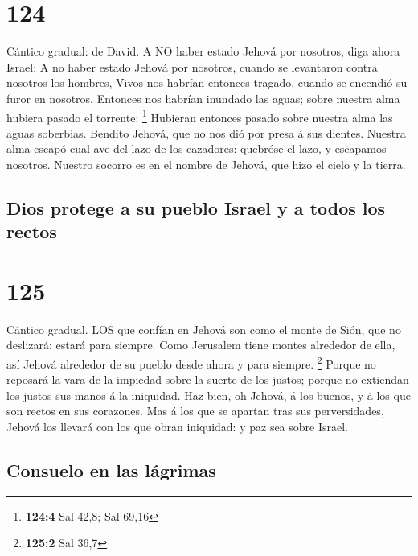 \hypertarget{section-123}{%
\section{124}\label{section-123}}

 Cántico gradual: de David. A NO haber estado Jehová por
nosotros, diga ahora Israel;  A no haber estado Jehová por
nosotros, cuando se levantaron contra nosotros los hombres, 
Vivos nos habrían entonces tragado, cuando se encendió su furor en
nosotros.  Entonces nos habrían inundado las aguas; sobre
nuestra alma hubiera pasado el torrente: \footnote{\textbf{124:4} Sal
  42,8; Sal 69,16}  Hubieran entonces pasado sobre nuestra
alma las aguas soberbias.  Bendito Jehová, que no nos dió
por presa á sus dientes.  Nuestra alma escapó cual ave del
lazo de los cazadores: quebróse el lazo, y escapamos nosotros.
 Nuestro socorro es en el nombre de Jehová, que hizo el
cielo y la tierra.

\hypertarget{dios-protege-a-su-pueblo-israel-y-a-todos-los-rectos}{%
\subsection{Dios protege a su pueblo Israel y a todos los
rectos}\label{dios-protege-a-su-pueblo-israel-y-a-todos-los-rectos}}

\hypertarget{section-124}{%
\section{125}\label{section-124}}

 Cántico gradual. LOS que confían en Jehová son como el
monte de Sión, que no deslizará: estará para siempre.  Como
Jerusalem tiene montes alrededor de ella, así Jehová alrededor de su
pueblo desde ahora y para siempre. \footnote{\textbf{125:2} Sal 36,7}
 Porque no reposará la vara de la impiedad sobre la suerte
de los justos; porque no extiendan los justos sus manos á la iniquidad.
 Haz bien, oh Jehová, á los buenos, y á los que son rectos
en sus corazones.  Mas á los que se apartan tras sus
perversidades, Jehová los llevará con los que obran iniquidad: y paz sea
sobre Israel.

\hypertarget{consuelo-en-las-luxe1grimas}{%
\subsection{Consuelo en las
lágrimas}\label{consuelo-en-las-luxe1grimas}}

